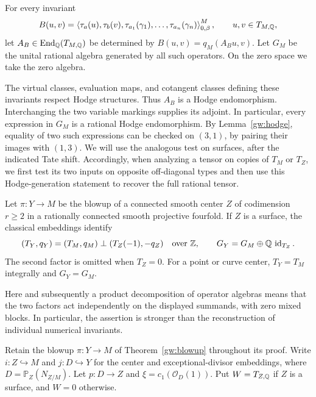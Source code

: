 \begin{definition}\label{gw:algebra}
For every invariant
\[
 B(u,v)=
 \left\langle\tau_a(u),\tau_b(v),
       \tau_{a_1}(\gamma_1),\ldots,\tau_{a_n}(\gamma_n)
 \right\rangle^M_{0,\beta},\qquad u,v\in T_{M,\mathbb Q},
\]
let $A_B\in\operatorname{End}_{\mathbb Q}(T_{M,\mathbb Q})$ be determined by
$B(u,v)=q_M(A_Bu,v)$.  Let $G_M$ be the unital rational algebra generated by
all such operators.  On the zero space we take the zero algebra.
\end{definition}

The virtual classes, evaluation maps, and cotangent classes defining these
invariants respect Hodge structures.  Thus $A_B$ is a Hodge endomorphism.
Interchanging the two variable markings supplies its adjoint.  In particular,
every expression in $G_M$ is a rational Hodge endomorphism.  By
Lemma~\ref{gw:hodge}, equality of two such expressions can be checked on
$(3,1)$, by pairing their images with $(1,3)$.  We will use the analogous
test on surfaces, after the indicated Tate shift.
Accordingly, when analyzing a tensor on copies of $T_M$ or $T_Z$, we first
test its two inputs on opposite off-diagonal types and then use this
Hodge-generation statement to recover the full rational tensor.

\begin{theorem}\label{gw:blowup}
Let $\pi:Y\to M$ be the blowup of a connected smooth center $Z$ of
codimension $r\geq2$ in a rationally connected smooth projective fourfold.
If $Z$ is a surface, the classical embeddings identify
\begin{equation}\label{gw:split-equation}
(T_Y,q_Y)=(T_M,q_M)\perp(T_Z(-1),-q_Z)
 \quad\text{over }\mathbb Z,
 \qquad
 G_Y=G_M\oplus\mathbb Q\,\operatorname{id}_{T_Z}.
\end{equation}
The second factor is omitted when $T_Z=0$.  For a point or curve center,
$T_Y=T_M$ integrally and $G_Y=G_M$.
\end{theorem}

Here and subsequently a product decomposition of operator algebras means
that the two factors act independently on the displayed summands, with
zero mixed blocks.  In particular, the assertion is stronger than the
reconstruction of individual numerical invariants.

Retain the blowup $\pi:Y\to M$ of Theorem~\ref{gw:blowup} throughout
its proof. Write $i:Z\hookrightarrow M$ and $j:D\hookrightarrow Y$
for the center and exceptional-divisor embeddings, where
$D=\mathbb P_Z(N_{Z/M})$. Let $p:D\to Z$ and
$\xi=c_1(\mathcal O_D(1))$. Put $W=T_{Z,\mathbb Q}$ if $Z$ is a surface,
and $W=0$ otherwise.


